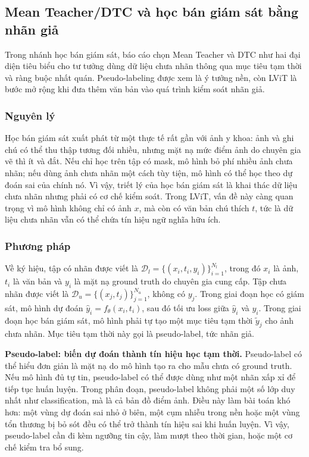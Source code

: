 \subsection{Mean Teacher/DTC và học bán giám sát bằng nhãn giả}

Trong nhánh học bán giám sát, báo cáo chọn Mean Teacher và DTC như hai đại diện tiêu biểu cho tư tưởng dùng dữ liệu chưa nhãn thông qua mục tiêu tạm thời và ràng buộc nhất quán. Pseudo-labeling được xem là ý tưởng nền, còn LViT là bước mở rộng khi đưa thêm văn bản vào quá trình kiểm soát nhãn giả.

\subsubsection{Nguyên lý}

Học bán giám sát xuất phát từ một thực tế rất gần với ảnh y khoa: ảnh và ghi chú có thể thu thập tương đối nhiều, nhưng mặt nạ mức điểm ảnh do chuyên gia vẽ thì ít và đắt. Nếu chỉ học trên tập có mask, mô hình bỏ phí nhiều ảnh chưa nhãn; nếu dùng ảnh chưa nhãn một cách tùy tiện, mô hình có thể học theo dự đoán sai của chính nó. Vì vậy, triết lý của học bán giám sát là khai thác dữ liệu chưa nhãn nhưng phải có cơ chế kiểm soát. Trong LViT, vấn đề này càng quan trọng vì mô hình không chỉ có ảnh \(x\), mà còn có văn bản chú thích \(t\), tức là dữ liệu chưa nhãn vẫn có thể chứa tín hiệu ngữ nghĩa hữu ích.

\subsubsection{Phương pháp}

Về ký hiệu, tập có nhãn được viết là \(\mathcal{D}_l=\{(x_i,t_i,y_i)\}_{i=1}^{N_l}\), trong đó \(x_i\) là ảnh, \(t_i\) là văn bản và \(y_i\) là mặt nạ ground truth do chuyên gia cung cấp. Tập chưa nhãn được viết là \(\mathcal{D}_u=\{(x_j,t_j)\}_{j=1}^{N_u}\), không có \(y_j\). Trong giai đoạn học có giám sát, mô hình dự đoán \(\hat{y}_i=f_\theta(x_i,t_i)\), sau đó tối ưu loss giữa \(\hat{y}_i\) và \(y_i\). Trong giai đoạn học bán giám sát, mô hình phải tự tạo một mục tiêu tạm thời \(\tilde{y}_j\) cho ảnh chưa nhãn. Mục tiêu tạm thời này gọi là pseudo-label, tức nhãn giả.

\textbf{Pseudo-label: biến dự đoán thành tín hiệu học tạm thời.} Pseudo-label có thể hiểu đơn giản là mặt nạ do mô hình tạo ra cho mẫu chưa có ground truth. Nếu mô hình đủ tự tin, pseudo-label có thể được dùng như một nhãn xấp xỉ để tiếp tục huấn luyện. Trong phân đoạn, pseudo-label không phải một số lớp duy nhất như classification, mà là cả bản đồ điểm ảnh. Điều này làm bài toán khó hơn: một vùng dự đoán sai nhỏ ở biên, một cụm nhiễu trong nền hoặc một vùng tổn thương bị bỏ sót đều có thể trở thành tín hiệu sai khi huấn luyện. Vì vậy, pseudo-label cần đi kèm ngưỡng tin cậy, làm mượt theo thời gian, hoặc một cơ chế kiểm tra bổ sung.

